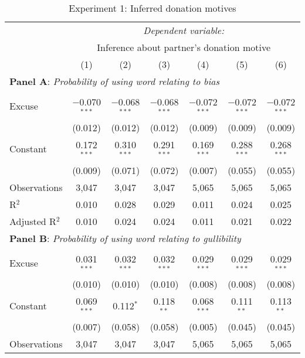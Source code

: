 \begin{table}[!htbp] \centering 
  \caption{Experiment 1: Inferred donation motives}
  \label{t:1-word}
\begin{threeparttable}
\begin{tabular}{@{\hspace{5pt}}l@{\hspace{5pt}}cccccc} 
\toprule 
 & \multicolumn{6}{c}{\textit{Dependent variable:}} \\ 
\cmidrule(rr){2-7} 
 & \multicolumn{6}{c}{Inference about partner's donation motive} \\ 
 & (1) & (2) & (3) & (4) & (5) & (6)\\ 
\midrule  
\midrule
\multicolumn{7}{l}{\textbf{Panel A}: \textit{Probability of using word relating to bias}} \\
\midrule
\\[-2.1ex] Excuse & $-$0.070$^{***}$ & $-$0.068$^{***}$ & $-$0.068$^{***}$ & $-$0.072$^{***}$ & $-$0.072$^{***}$ & $-$0.072$^{***}$ \\ 
  & (0.012) & (0.012) & (0.012) & (0.009) & (0.009) & (0.009) \\ 
 \addlinespace 
 Constant & 0.172$^{***}$ & 0.310$^{***}$ & 0.291$^{***}$ & 0.169$^{***}$ & 0.288$^{***}$ & 0.268$^{***}$ \\ 
  & (0.009) & (0.071) & (0.072) & (0.007) & (0.055) & (0.055) \\ 
 \addlinespace 
\midrule  
Observations & 3,047 & 3,047 & 3,047 & 5,065 & 5,065 & 5,065 \\ 
R$^{2}$ & 0.010 & 0.028 & 0.029 & 0.011 & 0.024 & 0.025 \\ 
Adjusted R$^{2}$ & 0.010 & 0.024 & 0.024 & 0.011 & 0.021 & 0.022 \\ 
\midrule
\midrule
\multicolumn{7}{l}{\textbf{Panel B}: \textit{Probability of using word relating to gullibility}} \\
\midrule
\\[-2.1ex] Excuse & 0.031$^{***}$ & 0.032$^{***}$ & 0.032$^{***}$ & 0.029$^{***}$ & 0.029$^{***}$ & 0.029$^{***}$ \\ 
  & (0.010) & (0.010) & (0.010) & (0.008) & (0.008) & (0.008) \\ 
 \addlinespace 
 Constant & 0.069$^{***}$ & 0.112$^{*}$ & 0.118$^{**}$ & 0.068$^{***}$ & 0.111$^{**}$ & 0.113$^{**}$ \\ 
  & (0.007) & (0.058) & (0.058) & (0.005) & (0.045) & (0.045) \\ 
 \addlinespace 
\midrule  
Observations & 3,047 & 3,047 & 3,047 & 5,065 & 5,065 & 5,065 \\ 

\end{tabular}
\end{threeparttable}
\end{table}
